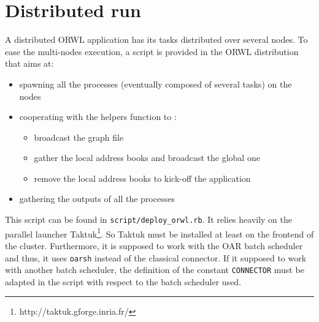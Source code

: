 \documentclass[10pt]{article}
\begin{document}
\section{Distributed run}
A distributed ORWL application has its tasks distributed over several
nodes. To ease the multi-nodes execution, a script is provided in the
ORWL distribution that aims at:
\begin{itemize}
\item spawning all the processes (eventually composed of several
  tasks) on the nodes
\item cooperating with the helpers function to :
\begin{itemize}
  \item broadcast the graph file
  \item gather the local address books and broadcast the global one
  \item remove the local address books to kick-off the application
\end{itemize}
\item gathering the outputs of all the processes
\end{itemize}

This script can be found in \texttt{script/deploy\_orwl.rb}. It relies
heavily on the parallel launcher
Taktuk\footnote{http://taktuk.gforge.inria.fr/}. So Taktuk must be
installed at least on the frontend of the cluster. Furthermore, it is
supposed to work with the OAR batch scheduler and thus, it uses
\texttt{oarsh} instead of the classical connector. If it supposed to
work with another batch scheduler, the definition of the constant
\texttt{CONNECTOR} must be adapted in the script with respect to the
batch scheduler used.
\end{document}
